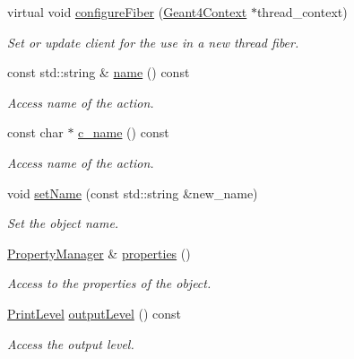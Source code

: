 \begin{DoxyCompactItemize}
virtual void \hyperlink{class_d_d4hep_1_1_simulation_1_1_geant4_action_a6adc7138508303e4e417cb48a737ab19}{configureFiber} (\hyperlink{class_d_d4hep_1_1_simulation_1_1_geant4_context}{Geant4Context} $\ast$thread\_\-context)
\begin{DoxyCompactList}\small\item\em Set or update client for the use in a new thread fiber. \item\end{DoxyCompactList}\item 
const std::string \& \hyperlink{class_d_d4hep_1_1_simulation_1_1_geant4_action_a3471b931eb84ab4fdc3fc4beddae512b}{name} () const 
\begin{DoxyCompactList}\small\item\em Access name of the action. \item\end{DoxyCompactList}\item 
const char $\ast$ \hyperlink{class_d_d4hep_1_1_simulation_1_1_geant4_action_a81f7a014edf0a3086149b3f45c14d826}{c\_\-name} () const 
\begin{DoxyCompactList}\small\item\em Access name of the action. \item\end{DoxyCompactList}\item 
void \hyperlink{class_d_d4hep_1_1_simulation_1_1_geant4_action_a88c6c831673b3c152961079507056daa}{setName} (const std::string \&new\_\-name)
\begin{DoxyCompactList}\small\item\em Set the object name. \item\end{DoxyCompactList}\item 
\hyperlink{class_d_d4hep_1_1_property_manager}{PropertyManager} \& \hyperlink{class_d_d4hep_1_1_simulation_1_1_geant4_action_a4159b11cc0acd293357e80980e3ba7d8}{properties} ()
\begin{DoxyCompactList}\small\item\em Access to the properties of the object. \item\end{DoxyCompactList}\item 
\hyperlink{namespace_d_d4hep_a5b5a64d56252469451f2020a27d57d42}{PrintLevel} \hyperlink{class_d_d4hep_1_1_simulation_1_1_geant4_action_a24f50b96085f6af082b8aaef3813e218}{outputLevel} () const 
\begin{DoxyCompactList}\small\item\em Access the output level. \item\end{DoxyCompactList}\item 

\end{DoxyCompactItemize}
